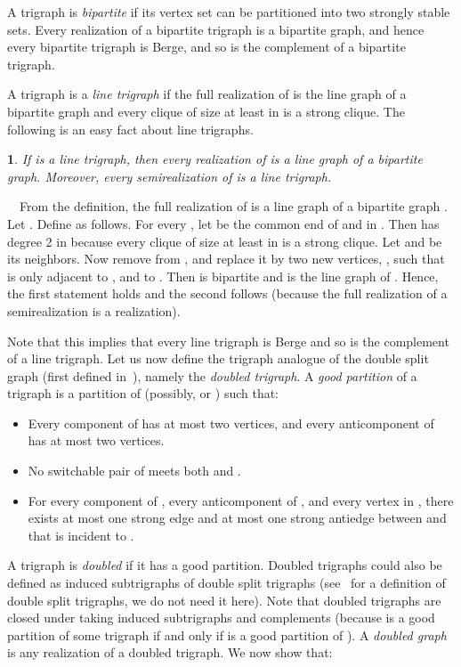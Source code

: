 \documentclass[11 pt] {article}
\newcommand\blackslug{\hbox{\hskip 1pt \vrule width 4pt height 8pt depth 1.5pt
        \hskip 1pt}}
\newcommand\bbox{\hfill \quad \blackslug \medbreak}
\newtheorem{theorem}{}[section]
\newcounter{claim}
\newcommand{\Proof}{\setcounter{claim}{0}\noindent{\bf Proof.}\ \ }
\begin{document}
A trigraph  is {\em bipartite} if its vertex set can be partitioned 
into two strongly stable sets. Every realization of a bipartite 
trigraph is a bipartite graph, and hence every bipartite trigraph is Berge, 
and so is the complement of a bipartite trigraph.

A trigraph  is a {\em line trigraph} if the full realization of 
is the line graph of a bipartite graph and every clique of size at
least  in  is a strong clique. The following is an easy fact
about line trigraphs.

\begin{theorem}
\label{linetrig}
If  is a line trigraph, then every realization of  is a line
graph of a bipartite graph.  Moreover, every semirealization of  is
a line trigraph.
\end{theorem}

\Proof From the definition, the full realization  of  is a line
graph of a bipartite graph . Let . Define
 as follows. For every , let
 be the common end of  and  in . Then  has
degree 2 in  because every clique of size at least  in  is a
strong clique. Let  and  be its neighbors. Now remove
 from , and replace it by two new vertices, ,
 such that  is only adjacent to , and 
to . Then  is bipartite and  is the line graph of
.  Hence, the first statement holds and the second follows
(because the full realization of a semirealization is a realization).
\bbox


Note that this implies that every line trigraph is Berge and so is the
complement of a line trigraph. Let us now define the trigraph analogue
of the double split graph (first defined in~\cite{CRST}), namely the
{\em doubled trigraph}.  A \emph{good partition} of a trigraph  is
a partition  of  (possibly,  or
) such that:

\begin{itemize}
\item Every  component of  has at most two vertices, and every
  anticomponent of  has at most two vertices.
\item No switchable pair of  meets both  and . 
\item For every component  of , every anticomponent  of
  , and every vertex  in , there exists at most
  one strong edge and at most one strong antiedge between  and
   that is incident to .
\end{itemize}

A trigraph is \emph{doubled} if it has a good partition.  Doubled
trigraphs could also be defined as induced subtrigraphs of double
split trigraphs (see~\cite{trigraphs} for a definition of double split
trigraphs, we do not need it here).  Note that doubled trigraphs are
closed under taking induced subtrigraphs and complements (because  is a good partition of some trigraph  if and only if 
is a good partition of ).  A \emph{doubled graph} is any
realization of a doubled trigraph. We now show that:
\end{document}
